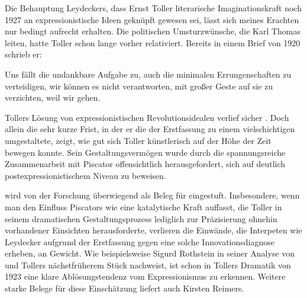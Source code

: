 Die Behauptung Leydeckers, dass Ernst Toller literarische Imaginationskraft
noch 1927 \Cite{sklavisch} an expressionistische Ideen geknüpft gewesen sei,
lässt sich meines Erachten nur bedingt aufrecht erhalten. Die politischen
Umsturzwünsche, die Karl Thomas leiten, hatte Toller schon lange vorher
relativiert. Bereits in einem Brief von 1920 schrieb er:

\begin{BlockQuote}
Uns fällt die undankbare Aufgabe zu, auch die minimalen Errungenschaften zu
verteidigen, wir können es nicht verantworten, mit großer Geste auf sie zu
verzichten, weil wir  gehen. 
\end{BlockQuote}
Tollers Lösung von expressionistischen Revolutionsidealen verlief sicher
\Cite{nicht glatt und eindeutig}. 
Doch allein die sehr kurze Frist,
in der er die \Cite{Unklarheit} der Erstfassung zu einem vielschichtigen
\Cite{Aufriß einer ganzen Epoche} 
umgestaltete, zeigt, wie gut sich Toller künstlerisch auf der Höhe der Zeit
bewegen konnte. Sein Gestaltungsvermögen wurde durch die spannungsreiche
Zusammenarbeit mit Piscator offensichtlich herausgefordert, sich auf
deutlich postexpressionistischem Niveau zu beweisen.  


 wird von der Forschung überwiegend als Beleg für
\Cite{Tollers Abschied von der expressionistischen
  Dramatik}  
eingestuft. Insbesondere, wenn man den Einfluss Piscators wie eine
katalytische Kraft auffasst, die Toller in seinem dramatischen
Gestaltungsprozess lediglich zur Präzisierung ohnehin vorhandener Einsichten
herausforderte, verlieren die Einwände, die Interpeten wie Leydecker aufgrund
der Erstfassung gegen eine solche Innovationsdiagnose erheben, an Gewicht. 
Wie beispielsweise Sigurd Rothstein in seiner Analyse von
 und Tollers nächstfrüherem Stück 
nachweist, ist schon in
Tollers Dramatik von 1923 eine klare Ablösungstendenz vom Expressionismus zu
erkennen.  
Weitere starke Belege für diese Einschätzung liefert auch Kirsten
Reimers. 

